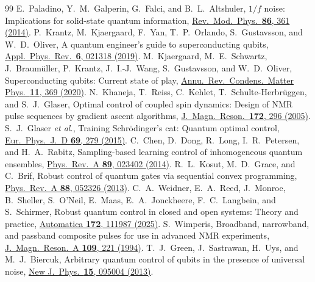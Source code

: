 \documentclass[aps,pra,twocolumn,superscriptaddress,reprint,nofootinbib,floatfix]{revtex4-2}
\theoremstyle{definition}
\begin{document}
\begin{thebibliography}{99}
 E.~Paladino, Y.~M.~Galperin, G.~Falci, and B.~L.~Altshuler, $1/f$ noise: Implications for solid-state quantum information, \href{https://doi.org/10.1103/RevModPhys.86.361}{Rev.\ Mod.\ Phys.\ \textbf{86}, 361 (2014)}.
 P.~Krantz, M.~Kjaergaard, F.~Yan, T.~P.~Orlando, S.~Gustavsson, and W.~D.~Oliver, A quantum engineer's guide to superconducting qubits, \href{https://doi.org/10.1063/1.5089550}{Appl.\ Phys.\ Rev.\ \textbf{6}, 021318 (2019)}.
 M.~Kjaergaard, M.~E.~Schwartz, J.~Braum\"uller, P.~Krantz, J.~I.-J.~Wang, S.~Gustavsson, and W.~D.~Oliver, Superconducting qubits: Current state of play, \href{https://doi.org/10.1146/annurev-conmatphys-031119-050605}{Annu.\ Rev.\ Condens.\ Matter Phys.\ \textbf{11}, 369 (2020)}.
 N.~Khaneja, T.~Reiss, C.~Kehlet, T.~Schulte-Herbr\"uggen, and S.~J.~Glaser, Optimal control of coupled spin dynamics: Design of NMR pulse sequences by gradient ascent algorithms, \href{https://doi.org/10.1016/j.jmr.2004.11.004}{J.\ Magn.\ Reson.\ \textbf{172}, 296 (2005)}.
 S.~J.~Glaser \emph{et al.}, Training Schr\"odinger's cat: Quantum optimal control, \href{https://doi.org/10.1140/epjd/e2015-60464-1}{Eur.\ Phys.\ J.\ D \textbf{69}, 279 (2015)}.
 C.~Chen, D.~Dong, R.~Long, I.~R.~Petersen, and H.~A.~Rabitz, Sampling-based learning control of inhomogeneous quantum ensembles, \href{https://doi.org/10.1103/PhysRevA.89.023402}{Phys.\ Rev.\ A \textbf{89}, 023402 (2014)}.
 R.~L.~Kosut, M.~D.~Grace, and C.~Brif, Robust control of quantum gates via sequential convex programming, \href{https://doi.org/10.1103/PhysRevA.88.052326}{Phys.\ Rev.\ A \textbf{88}, 052326 (2013)}.
 C.~A.~Weidner, E.~A.~Reed, J.~Monroe, B.~Sheller, S.~O'Neil, E.~Maas, E.~A.~Jonckheere, F.~C.~Langbein, and S.~Schirmer, Robust quantum control in closed and open systems: Theory and practice, \href{https://doi.org/10.1016/j.automatica.2024.111987}{Automatica \textbf{172}, 111987 (2025)}.
 S.~Wimperis, Broadband, narrowband, and passband composite pulses for use in advanced NMR experiments, \href{https://doi.org/10.1006/jmra.1994.1159}{J.\ Magn.\ Reson.\ A \textbf{109}, 221 (1994)}.
 T.~J.~Green, J.~Sastrawan, H.~Uys, and M.~J.~Biercuk, Arbitrary quantum control of qubits in the presence of universal noise, \href{https://doi.org/10.1088/1367-2630/15/9/095004}{New J.\ Phys.\ \textbf{15}, 095004 (2013)}.

\end{thebibliography}
\end{document}
